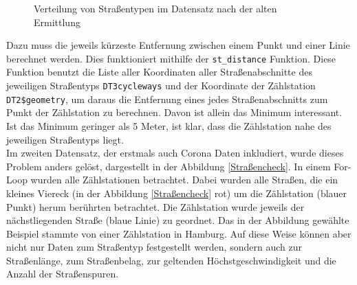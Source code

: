 \documentclass[a4paper,12pt]{thesis}
\begin{document}
\begin{figure}[!ht]%
	\centering
	\qquad
	\caption{Verteilung von Straßentypen im Datensatz nach der alten Ermittlung}
	\label{Straßentypen}%
\end{figure}

Dazu muss die jeweils kürzeste Entfernung zwischen einem Punkt und einer Linie berechnet werden. Dies funktioniert mithilfe der \lstinline|st_distance| Funktion. Diese Funktion benutzt die Liste aller Koordinaten aller Straßenabschnitte des jeweiligen Straßentyps \lstinline|DT3cycleways| und der Koordinate der Zählstation \lstinline|DT2$geometry|, um daraus die Entfernung eines jedes Straßenabschnitts zum Punkt der Zählstation zu berechnen. Davon ist allein das Minimum interessant. Ist das Minimum geringer als 5 Meter, ist klar, dass die Zählstation nahe des jeweiligen Straßentyps liegt.\\

Im zweiten Datensatz, der erstmals auch Corona Daten inkludiert, wurde dieses Problem anders gelöst, dargestellt in der Abbildung \ref{Straßencheck}. In einem For-Loop wurden alle Zählstationen betrachtet. Dabei wurden alle Straßen, die ein kleines Viereck (in der Abbildung \ref{Straßencheck} rot) um die Zählstation (blauer Punkt) herum berührten betrachtet. Die Zählstation wurde jeweils der nächstliegenden Straße (blaue Linie) zu geordnet. Das in der Abbildung gewählte Beispiel stammte von einer Zählstation in Hamburg. Auf diese Weise können aber nicht nur Daten zum Straßentyp festgestellt werden, sondern auch zur Straßenlänge, zum Straßenbelag, zur geltenden Höchstgeschwindigkeit und die Anzahl der Straßenspuren.\\
\end{document}
